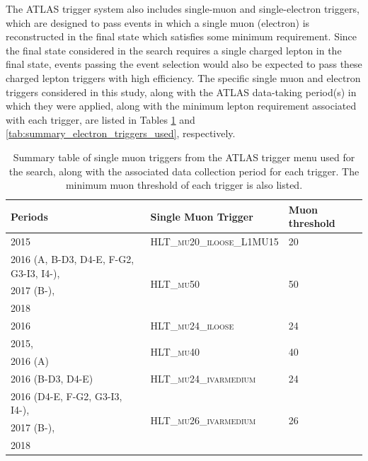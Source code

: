 The ATLAS trigger system also includes single-muon and single-electron triggers, which are designed to pass events in which a single muon (electron) is reconstructed in the final state which satisfies some minimum \pt requirement. Since the final state considered in the search requires a single charged lepton in the final state, events passing the event selection would also be expected to pass these charged lepton triggers with high efficiency. The specific single muon and electron triggers considered in this study, along with the ATLAS data-taking period(s) in which they were applied, along with the minimum lepton \pt requirement associated with each trigger, are listed in Tables \ref{tab:summary_muon_triggers_used} and \ref{tab:summary_electron_triggers_used}, respectively.

\begin{table}[ht]
\caption{Summary table of single muon triggers from the ATLAS trigger menu used for the search, along with the associated data collection period for each trigger. The minimum muon \pt threshold of each trigger is also listed.}
\label{tab:summary_muon_triggers_used}
\footnotesize{
	\begin{center}
	\begin{tabular}{l l l }
		\toprule
			Periods & Single Muon Trigger & Muon \pt threshold \\
			\midrule
			\midrule
			2015 & \textsc{HLT\_mu20\_iloose\_L1MU15} & 20 \GeV \\
			\midrule
			2016 (A, B-D3, D4-E, F-G2, G3-I3, I4-), & \multirow{3}{*}{\textsc{HLT\_mu50}} & \multirow{3}{*}{50 \GeV} \\
			2017 (B-), & & \\
			2018 & & \\
			\midrule
			2016 & \textsc{HLT\_mu24\_iloose} & 24 \GeV \\
			\midrule
			2015, & \multirow{2}{*}{\textsc{HLT\_mu40}} & \multirow{2}{*}{40 \GeV} \\
			2016 (A) & & \\
			\midrule
			2016 (B-D3, D4-E) & \textsc{HLT\_mu24\_ivarmedium} & 24 \GeV \\
			\midrule
			2016 (D4-E, F-G2, G3-I3, I4-),  & \multirow{3}{*}{\textsc{HLT\_mu26\_ivarmedium}} & \multirow{3}{*}{26 \GeV} \\
			2017 (B-), \\
			2018 \\
		\bottomrule
	\end{tabular}
	\end{center}
	}
\end{table}

